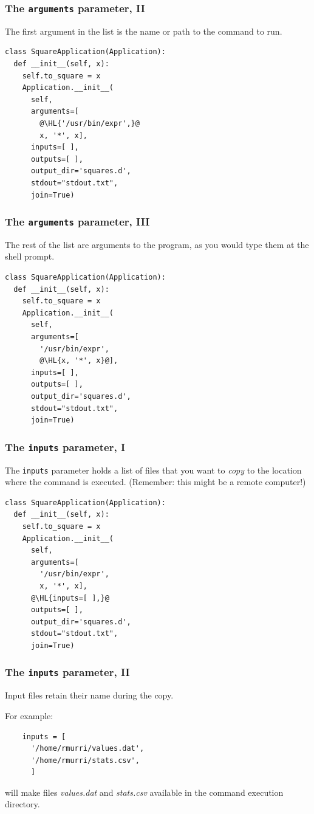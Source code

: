 \documentclass[english,serif,mathserif,xcolor=pdftex,dvipsnames,table]{beamer}
\begin{document}
\begin{frame}[fragile]
\frametitle{The \texttt{arguments} parameter, II}

The first argument in the list is the name or path to the command to run.

  \+
\begin{lstlisting}
class SquareApplication(Application):
  def __init__(self, x):
    self.to_square = x
    Application.__init__(
      self,
      arguments=[
        @\HL{'/usr/bin/expr',}@
        x, '*', x],
      inputs=[ ],
      outputs=[ ],
      output_dir='squares.d',
      stdout="stdout.txt",
      join=True)
\end{lstlisting}
\end{frame}

\begin{frame}[fragile]
\frametitle{The \texttt{arguments} parameter, III}

The rest of the list are arguments to the program, as you would type
them at the shell prompt.

  \+
\begin{lstlisting}
class SquareApplication(Application):
  def __init__(self, x):
    self.to_square = x
    Application.__init__(
      self,
      arguments=[
        '/usr/bin/expr',
        @\HL{x, '*', x}@],
      inputs=[ ],
      outputs=[ ],
      output_dir='squares.d',
      stdout="stdout.txt",
      join=True)
\end{lstlisting}
\end{frame}


\begin{frame}[fragile]
\frametitle{The \texttt{inputs} parameter, I}

The \texttt{inputs} parameter holds a list of files that you want to
\emph{copy} to the location where the command is executed. (Remember:
this might be a remote computer!)

  \+
\begin{lstlisting}
class SquareApplication(Application):
  def __init__(self, x):
    self.to_square = x
    Application.__init__(
      self,
      arguments=[
        '/usr/bin/expr', 
        x, '*', x],
      @\HL{inputs=[ ],}@
      outputs=[ ],
      output_dir='squares.d',
      stdout="stdout.txt",
      join=True)
\end{lstlisting}
\end{frame}


\begin{frame}[fragile]
  \frametitle{The \texttt{inputs} parameter, II}

  Input files retain their name during the copy.

  \+
  For example:
  \begin{lstlisting}
    inputs = [
      '/home/rmurri/values.dat',
      '/home/rmurri/stats.csv',
      ]
  \end{lstlisting}
  will make files \emph{values.dat} and \emph{stats.csv} available in
  the command execution directory.

\end{frame}
\end{document}

